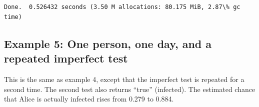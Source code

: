 \documentclass[11pt]{article}
\begin{document}
    \begin{center}
    \end{center}
    { \hspace*{\fill} \\}
    
    \begin{Verbatim}[commandchars=\\\{\}]

Done.  0.526432 seconds (3.50 M allocations: 80.175 MiB, 2.87\% gc time)
    \end{Verbatim}
\newpage
    \hypertarget{example-5-one-person-one-day-and-a-repeated-imperfect-test}{%
\subsection{Example 5: One person, one day, and a repeated imperfect
test}\label{example-5-one-person-one-day-and-a-repeated-imperfect-test}}

This is the same as example 4, except that the imperfect test is
repeated for a second time. The second test also returns ``true''
(infected). The estimated chance that Alice is actually infected rises
from 0.279 to 0.884.
\end{document}
